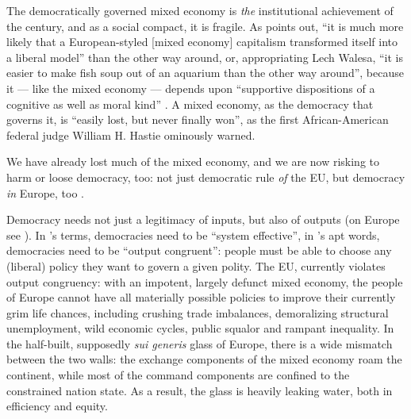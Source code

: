 \documentclass[11pt,a4paper,oneside,openright]{article}
\begin{document}
The democratically governed mixed economy is \emph{the} institutional achievement of the century, and as a social compact, it is fragile. 
As \citeauthor{Offe2003} points out, ``it is much more likely that a European-styled [mixed economy] capitalism transformed itself into a liberal model'' than the other way around, or, appropriating Lech Walesa, ``it is easier to make fish soup out of an aquarium than the other way around'', because it --- like the mixed economy --- depends upon ``supportive dispositions of a cognitive as well as moral kind'' \citeyearpar[446]{Offe2003}. 
A mixed economy, as the democracy that governs it, is ``easily lost, but never finally won'', as the first African-American federal judge William H. Hastie ominously warned. 

We have already lost much of the mixed economy, and we are now risking to harm or loose democracy, too: 
not just democratic rule \emph{of} the \gls{EU}, but democracy \emph{in} Europe, too \citep[19]{Scharpf1997}.

Democracy needs not just a legitimacy of inputs, but also of outputs (on Europe see \citealt{SchaGove1999}). 
In \citeauthor{Dahl-1994-ab}'s \citeyearpar{Dahl-1994-ab} terms, democracies need to be ``system effective'', in \citeauthor{Zurn-2000-aa}'s \citeyearpar{Zurn-2000-aa} apt words, democracies need to be ``output congruent'': 
people must be able to choose any (liberal) policy they want to govern a given polity. 
The \gls{EU}, currently violates output congruency: 
with an impotent, largely defunct mixed economy, the people of Europe cannot have all materially possible policies to improve their currently grim life chances, including crushing trade imbalances, demoralizing structural unemployment, wild economic cycles, public squalor and rampant inequality. 
In the half-built, supposedly \emph{sui generis} glass of Europe, there is a wide mismatch between the two walls: 
the exchange components of the mixed economy roam the continent, while most of the command components are confined to the constrained nation state. 
As a result, the glass is heavily leaking water, both in efficiency and equity.
\end{document}
